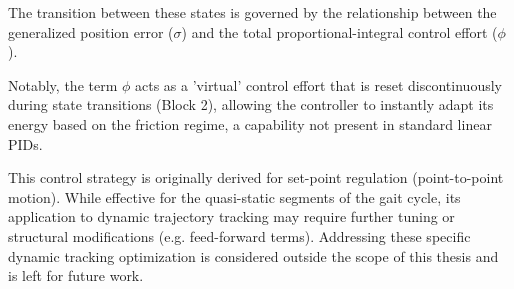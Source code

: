 The transition between these states is governed by the relationship between the generalized position error
($\sigma$) and the total proportional-integral control effort ($\phi$).

Notably, the term $\phi$ acts as a 'virtual' control effort that is reset discontinuously during state
transitions (Block 2), allowing the controller to instantly adapt its energy based on the
friction regime, a capability not present in standard linear PIDs.

This control strategy is originally derived for set-point regulation (point-to-point motion). While effective for
the quasi-static segments of the gait cycle, its application to dynamic trajectory tracking may require further
tuning or structural modifications (e.g. feed-forward terms). Addressing these specific dynamic tracking
optimization is considered outside the scope of this thesis and is left for future work.



